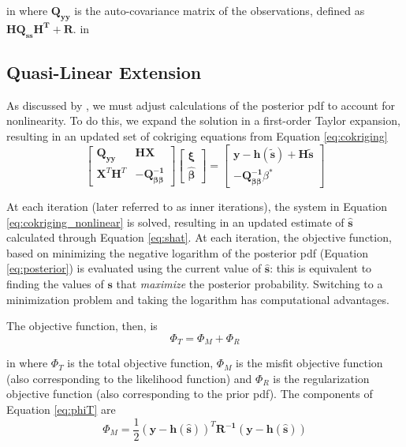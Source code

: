\documentclass[11pt,oneside,onecolumn]{usgsreport}
\begin{document}
\begin{appendix}
 in
where $\mathbf{Q_{yy}}$ is the auto-covariance matrix of the observations,
defined as $\mathbf{HQ_{ss}H^{\mathbf{T}}+R}$.
 in

\subsection{Quasi-Linear Extension}

As discussed by \citet{Kitanidis1995}, we must adjust calculations
of the posterior pdf to account for nonlinearity. To do this, we expand
the solution in a first-order Taylor expansion, resulting in an updated
set of cokriging equations from Equation \ref{eq:cokriging}
\begin{equation}
\left[\begin{array}{cc}
\mathbf{Q_{yy}} & \mathbf{HX}\\
\mathbf{X}^{T}\mathbf{H}^{T} & \mathbf{-}\mathbf{Q_{\beta\beta}^{-1}}
\end{array}\right]\left[\begin{array}{c}
\mathbf{\xi}\\
\mathbf{\hat{\beta}}
\end{array}\right]=\left[\begin{array}{c}
\mathbf{y}-\mathbf{h}\left(\mathbf{\tilde{s}}\right)+\mathbf{H}\tilde{\mathbf{s}}\\
\mathbf{-}\mathbf{Q_{\beta\beta}^{-1}}\beta^{*}
\end{array}\right]\label{eq:cokriging_nonlinear}
\end{equation}


At each iteration (later referred to as inner iterations), the system
in Equation \ref{eq:cokriging_nonlinear} is solved, resulting in
an updated estimate of $\hat{\mathbf{s}}$ calculated through Equation
\ref{eq:shat}. At each iteration, the objective function, based on
minimizing the negative logarithm of the posterior pdf (Equation \ref{eq:posterior})
is evaluated using the current value of $\mathbf{\hat{s}}$: this
is equivalent to finding the values of $\mathbf{s}$ that \emph{maximize
}the posterior probability. Switching to a minimization problem and
taking the logarithm has computational advantages. 

The objective function, then, is 
\begin{equation}
\Phi_{T}=\Phi_{M}+\Phi_{R}\label{eq:phiT}
\end{equation}

 in
where $\Phi_{T}$ is the total objective function, $\Phi_{M}$
is the misfit objective function (also corresponding to the likelihood
function) and $\Phi_{R}$ is the regularization objective
function (also corresponding to the prior pdf). The components of
Equation \ref{eq:phiT} are
\[
\Phi_{M}=\frac{1}{2}\left(\mathbf{y-h}(\mathbf{\hat{s}})\right)^{T}\mathbf{R^{-1}\left(\mathbf{y-h}(\mathbf{\hat{s}})\right)}
\]



\end{appendix}
\end{document}
